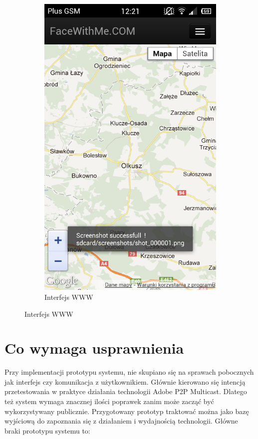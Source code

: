 \begin{figure}[h]
\begin{subfigure}[b]{0.3\textwidth}
                \centering
                \includegraphics[width=\textwidth]{img/screens/mobile_broadcaster/interfejs-www.png}
                \caption{Interfejs WWW}
        \end{subfigure}
\end{figure}

\section{Co wymaga usprawnienia}

Przy implementacji prototypu systemu, nie skupiano się na sprawach pobocznych jak interfejs czy komunikacja z użytkownikiem. Głównie kierowano się intencją przetestowania w praktyce działania technologii Adobe P2P Multicast. Dlatego też system wymaga znacznej ilości poprawek zanim może zacząć być wykorzystywany publicznie. Przygotowany prototyp traktować można jako bazę wyjściową do zapoznania się z działaniem i wydajnością technologii. Główne braki prototypu systemu to:


